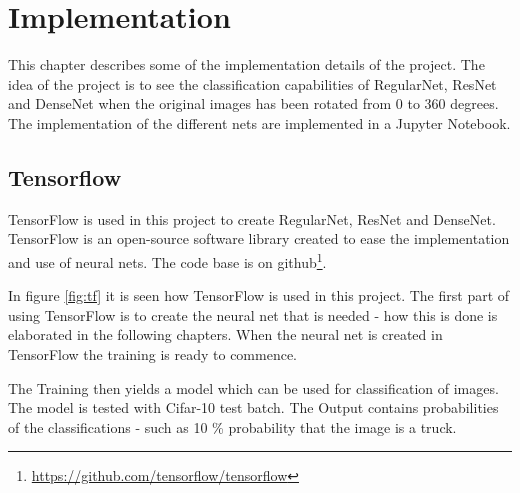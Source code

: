 \chapter{Implementation}
\label{chp:impl}

This chapter describes some of the implementation details of the project. The idea of the project is to see the classification capabilities of RegularNet, ResNet and DenseNet when the original images has been rotated from 0 to 360 degrees. The implementation of the different nets are implemented in a Jupyter Notebook.

\section{Tensorflow}
TensorFlow is used in this project to create RegularNet, ResNet and DenseNet. 
TensorFlow is an open-source software library created to ease the implementation and use of neural nets. The code base is on github\footnote{\url{https://github.com/tensorflow/tensorflow}}.

In figure \ref{fig:tf} it is seen how TensorFlow is used in this project. The first part of using TensorFlow is to create the neural net that is needed - how this is done is elaborated in the following chapters. When the neural net is created in TensorFlow the training is ready to commence. 

The Training then yields a model which can be used for classification of images. The model is tested with Cifar-10 test batch. The Output contains probabilities of the classifications - such as 10 \% probability that the image is a truck.







